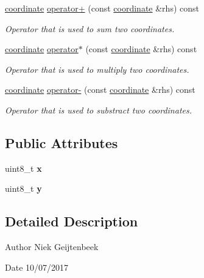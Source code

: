 \begin{DoxyCompactItemize}
\hyperlink{classcoordinate}{coordinate} \hyperlink{classcoordinate_ad82716aaea1e1ca9bc2bd28121e9ff3e}{operator+} (const \hyperlink{classcoordinate}{coordinate} \&rhs) const
\begin{DoxyCompactList}\small\item\em Operator that is used to sum two coordinates. \end{DoxyCompactList}\item 
\hyperlink{classcoordinate}{coordinate} \hyperlink{classcoordinate_a5584a14ea2bf68d9f836f281ff0eca87}{operator$\ast$} (const \hyperlink{classcoordinate}{coordinate} \&rhs) const
\begin{DoxyCompactList}\small\item\em Operator that is used to multiply two coordinates. \end{DoxyCompactList}\item 
\hyperlink{classcoordinate}{coordinate} \hyperlink{classcoordinate_a6ffffa3a991bcbe09be645a8ed089624}{operator-\/} (const \hyperlink{classcoordinate}{coordinate} \&rhs) const
\begin{DoxyCompactList}\small\item\em Operator that is used to substract two coordinates. \end{DoxyCompactList}\end{DoxyCompactItemize}
\subsection*{Public Attributes}
\begin{DoxyCompactItemize}
\item 
\mbox{\label{classcoordinate_a30a97b1857e38204ea973bfdb653ccac}} 
uint8\+\_\+t {\bfseries x}
\item 
\mbox{\label{classcoordinate_a2281f38aa3d76247b60cbea68e0535ee}} 
uint8\+\_\+t {\bfseries y}
\end{DoxyCompactItemize}


\subsection{Detailed Description}
\begin{DoxyAuthor}{Author}
Niek Geijtenbeek 
\end{DoxyAuthor}
\begin{DoxyDate}{Date}
10/07/2017 
\end{DoxyDate}


